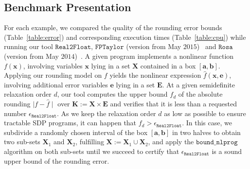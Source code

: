 \documentclass[preprint]{sigplanconf}
\newcommand{\x}{\mathbf{x}}
\newcommand{\e}{\mathbf{e}}
\renewcommand{\b}{\mathbf{b}}
\def\a{\mathbf{a}}
\def\E{\mathbf{E}}
\def\K{\mathbf{K}}
\def\X{\mathbf{X}}
\newcommand{\boundnlprog}{\mathtt{bound\_nlprog}}
\newcommand{\realtofloat}{\mathtt{Real2Float}}
\newcommand{\rosa}{\mathtt{Rosa}}
\newcommand{\fptaylor}{\mathtt{FPTaylor}}
\theoremstyle{plain}
\begin{document}
\subsection{Benchmark Presentation}
For each example, we compared the quality of the rounding error bounds (Table~\ref{table:error}) and corresponding execution times (Table~\ref{table:cpu}) while running our tool $\realtofloat$, $\fptaylor$ (version from May $2015$)~\cite{fptaylor15} and $\rosa$ (version from  May $2014$)~\cite{Darulova14Popl}.
A given program implements a nonlinear function $f(\x)$, involving variables $\x$ lying in a set $\X$ contained in a box $[\a, \b]$.
Applying our rounding model on $f$ yields the nonlinear expression $\hat{f}(\x,\e)$, involving additional error variables $\e$ lying in a set $\E$. 
At a given semidefinite relaxation order $d$, our tool computes the upper bound $f_d$ of the absolute rounding $\mid f - \hat{f} \mid $ over $\K := \X \times \E$ and verifies that it is less than a requested number $\epsilon_{\realtofloat}$. As we keep the relaxation order $d$ as low as possible to ensure tractable SDP programs, it can happen that $f_d > \epsilon_{\realtofloat}$. 
 In this case, we subdivide a randomly chosen interval of the box  $[\a, \b]$ in two halves to obtain two sub-sets $\X_1$ and $\X_2$, fulfilling $\X := \X_1 \cup \X_2$, and apply the $\boundnlprog$ algorithm on both sub-sets until we succeed to certify that $\epsilon_{\realtofloat}$ is a sound upper bound of the rounding error.
\end{document}
